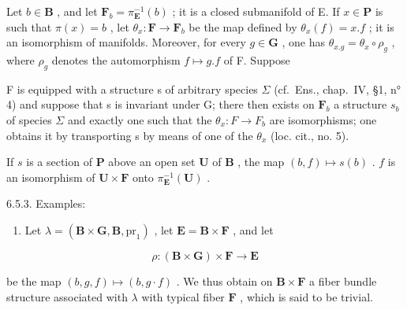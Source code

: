 Let \(b \in \mathbf{B}\) , and let \(\mathbf{F}_b = \pi_{\mathbf{E}}^{-1}(b)\) ; it is a closed submanifold of E. If \(x \in \mathbf{P}\) is such that \(\pi(x) = b\) , let \(\theta_x: \mathbf{F} \to \mathbf{F}_b\) be the map defined by \(\theta_x(f) = x.f\) ; it is an isomorphism of manifolds. Moreover, for every \(g \in \mathbf{G}\) , one has \(\theta_{x.g} = \theta_x \circ \rho_g\) , where \(\rho_g\) denotes the automorphism \(f \mapsto g.f\) of F. Suppose

F is equipped with a structure s of arbitrary species \(\Sigma\) (cf.~Ens., chap.~IV, §1, n° 4) and suppose that s is invariant under G; there then exists on \(\mathbf{F}_{b}\) a structure \(s_{b}\) of species \(\Sigma\) and exactly one such that the \(\theta_{x}: F \to F_{b}\) are isomorphisms; one obtains it by transporting s by means of one of the \(\theta_{x}\) (loc. cit., no. 5).

If \(s\) is a section of \(\mathbf{P}\) above an open set \(\mathbf{U}\) of \(\mathbf{B}\) , the map \((b, f) \mapsto s(b)\) . \(f\) is an isomorphism of \(\mathbf{U} \times \mathbf{F}\) onto \(\pi_{\mathbf{E}}^{-1}(\mathbf{U})\) .

6.5.3. Examples:

\begin{enumerate}
\def\labelenumi{(\alph{enumi})}
\tightlist
\item
  Let \(\lambda = (\mathbf{B} \times \mathbf{G}, \mathbf{B}, \mathrm{pr}_1)\) , let \(\mathbf{E} = \mathbf{B} \times \mathbf{F}\) , and let
\end{enumerate}

\[
\rho : (\mathbf {B} \times \mathbf {G}) \times \mathbf {F} \rightarrow \mathbf {E}
\]

be the map \((b, g, f) \mapsto (b, g \cdot f)\) . We thus obtain on \(\mathbf{B} \times \mathbf{F}\) a fiber bundle structure associated with \(\lambda\) with typical fiber \(\mathbf{F}\) , which is said to be trivial.

